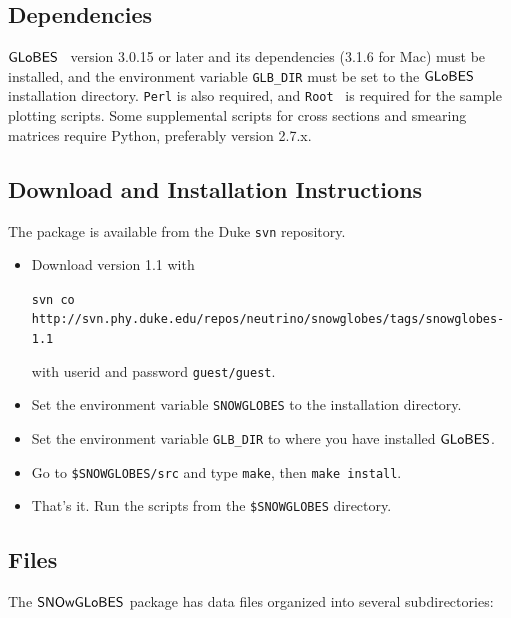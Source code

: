 \documentclass[12pt]{article}
\newcommand{\globes}{\sf{GLoBES}}
\newcommand{\snowglobes}{\sf{SNOwGLoBES}}
\begin{document}
\subsection{Dependencies}

$\globes$~\cite{globes} version 3.0.15 or later and its dependencies
(3.1.6 for Mac)  must be installed, and the
environment variable \texttt{GLB\_DIR} must be set to the $\globes$
installation directory.  \texttt{Perl} is also required, and \texttt{Root}~\cite{root} is required for the sample plotting scripts.
Some supplemental scripts for cross sections and smearing matrices require
Python, preferably version 2.7.x.

\subsection{Download and Installation Instructions}

The package is available from the Duke \texttt{svn} repository.

\begin{itemize}
\item Download version 1.1 with

\noindent
\texttt{svn co http://svn.phy.duke.edu/repos/neutrino/snowglobes/tags/snowglobes-1.1}

with userid and password \texttt{guest/guest}.

\item Set the environment variable \texttt{SNOWGLOBES} to the installation directory.

\item Set the environment variable \texttt{GLB\_DIR} to where you have installed $\globes$.

\item Go to \texttt{\$SNOWGLOBES/src} and type \texttt{make}, then
\texttt{make install}.

\item That's it.  Run the scripts from the \texttt{\$SNOWGLOBES} directory.

\end{itemize}

\subsection{Files}

The $\snowglobes$ package has data files organized into several subdirectories:
\end{document}
